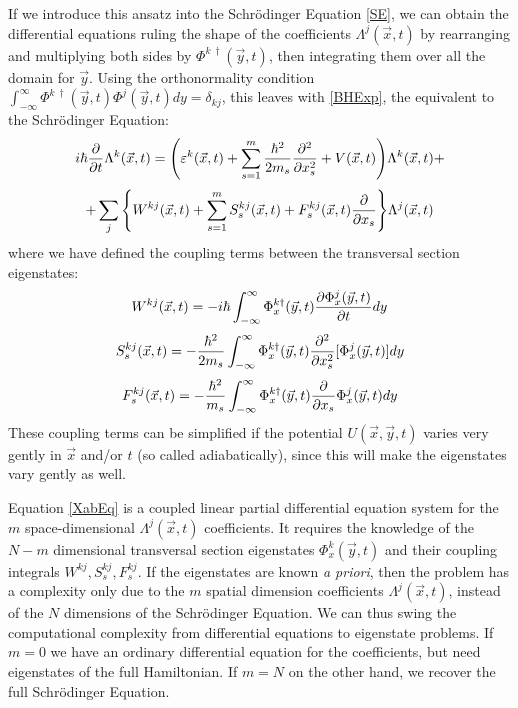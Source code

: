 \documentclass[11pt, a4paper]{article} %
\begin{document}
If we introduce this ansatz into the Schrödinger Equation \eqref{SE}, we can obtain the differential equations ruling the shape of the coefficients $\Lambda^j(\vec{x},t)$ by rearranging and multiplying both sides by $\Phi^{k\ \dagger}(\vec{y},t)$, then integrating them over all the domain for $\vec{y}$. Using the orthonormality condition $\int_{-\infty}^{\infty}\Phi^{k\ \dagger}(\vec{y},t) \Phi^{j}(\vec{y},t) dy= \delta_{kj}$, this leaves with \eqref{BHExp}, the equivalent to the Schrödinger Equation:\vspace{-0.1cm}
\begin{equation}\label{XabEq}
i\hbar \pdv{}{t}\Lambda^k(\vec{x},t) = \qty( \varepsilon^k(\vec{x},t) + \sum_{s=1}^m\frac{\hbar^2}{2m_s}\pdv[2]{}{x_s}+V(\vec{x},t))\Lambda^k(\vec{x},t)+
\end{equation}
$$
 +\sum_j \qty{ W^{kj}(\vec{x},t) + \sum_{s=1}^m S^{kj}_s(\vec{x},t)+F^{kj}_s(\vec{x},t)\pdv{}{x_s} } \Lambda^j(\vec{x},t) 
$$
where we have defined the coupling terms between the transversal section eigenstates:
\begin{equation}\label{W_c}
W^{kj}(\vec{x},t) = -i\hbar\int_{-\infty}^{\infty}\Phi_x^{k\dagger}(\vec{y},t) \pdv{\Phi^j_x(\vec{y},t)}{t} dy
\end{equation}
\begin{equation}\label{S}
S^{kj}_s(\vec{x},t) = -\frac{\hbar^2}{2m_s}\int_{-\infty}^{\infty}\Phi_x^{k\dagger}(\vec{y},t) \pdv[2]{}{x_s} [\Phi^j_x(\vec{y},t)] dy
\end{equation}
\begin{equation}\label{F}
F^{kj}_s(\vec{x},t) = -\frac{\hbar^2}{m_s}\int_{-\infty}^{\infty}\Phi_x^{k\dagger}(\vec{y},t) \pdv{}{x_s}\Phi^j_x(\vec{y},t) dy
\end{equation}
These coupling terms can be simplified if the potential $U(\vec{x},\vec{y},t)$ varies very gently in $\vec{x}$ and/or $t$ (so called adiabatically), since this will make the eigenstates vary gently as well.

Equation \eqref{XabEq} is a coupled linear partial differential equation system for the $m$ space-dimensional $\Lambda^j(\vec{x},t)$ coefficients. It requires the knowledge of the $N-m$ dimensional transversal section eigenstates $\Phi^k_x(\vec{y},t)$ and their coupling integrals $W^{kj}, S^{kj}_s, F^{kj}_s$.  If the eigenstates are known {\em a priori}, then the problem has a complexity only due to the $m$ spatial dimension coefficients $\Lambda^j(\vec{x},t)$, instead of the $N$ dimensions of the Schrödinger Equation. We can thus swing the computational complexity from differential equations to eigenstate problems. If $m=0$ we have an ordinary differential equation for the coefficients, but need eigenstates of the full Hamiltonian. If $m=N$ on the other hand, we recover the full Schrödinger Equation.
\vspace{-0.3cm}
\end{document}
